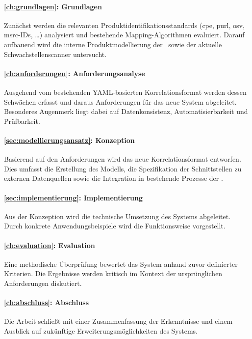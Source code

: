 \paragraph{\autoref{ch:grundlagen}: Grundlagen}
Zunächst werden die relevanten Produktidentifikationsstandards (\acrshort{cpe}, \acrshort{purl}, \acrshort{osv}, \acrshort{msrc}-IDs, \ldots) analysiert und bestehende Mapping-Algorithmen evaluiert.
Darauf aufbauend wird die interne Produktmodellierung der \metaeffekt\  sowie der aktuelle Schwachstellenscanner untersucht.

\paragraph{\autoref{ch:anforderungen}: Anforderungsanalyse}
Ausgehend vom bestehenden YAML-basierten Korrelationsformat werden dessen Schwächen erfasst und daraus Anforderungen für das neue System abgeleitet.
Besonderes Augenmerk liegt dabei auf Datenkonsistenz, Automatisierbarkeit und Prüfbarkeit.

\paragraph{\autoref{sec:modellierungsansatz}: Konzeption}
Basierend auf den Anforderungen wird das neue Korrelationsformat entworfen.
Dies umfasst die Erstellung des Modells, die Spezifikation der Schnittstellen zu externen Datenquellen sowie die Integration in bestehende Prozesse der \metaeffekt.

\paragraph{\autoref{sec:implementierung}: Implementierung}
Aus der Konzeption wird die technische Umsetzung des Systems abgeleitet.
Durch konkrete Anwendungsbeispiele wird die Funktionsweise vorgestellt.

\paragraph{\autoref{ch:evaluation}: Evaluation}
Eine methodische Überprüfung bewertet das System anhand zuvor definierter Kriterien.
Die Ergebnisse werden kritisch im Kontext der ursprünglichen Anforderungen diskutiert.

\paragraph{\autoref{ch:abschluss}: Abschluss}
Die Arbeit schließt mit einer Zusammenfassung der Erkenntnisse und einem Ausblick auf zukünftige Erweiterungsmöglichkeiten des Systems.
